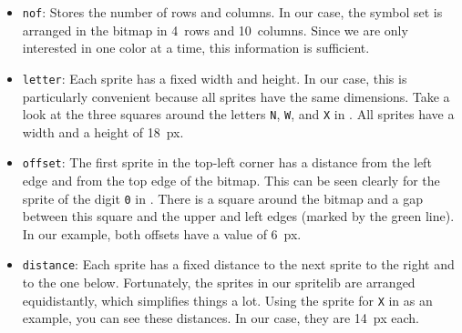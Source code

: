 \begin{itemize}
	\item \texttt{nof}: Stores the number of rows and columns. In our case, the symbol set is arranged in the bitmap in 4~rows and 10~columns.	Since we are only interested in one color at a time, this information is sufficient.
	
	\item \texttt{letter}: Each sprite has a fixed width and height. In our case, this is particularly convenient because all sprites have the same dimensions. Take a look at the three squares around the letters \texttt{N}, \texttt{W}, and \texttt{X} in . All sprites have a width and a height of \SI{18}{px}.
	
	\item \texttt{offset}: The first sprite in the top-left corner has a distance from the left edge and from the top edge of the bitmap. This can be seen clearly for the sprite of the digit \texttt{0} in . There is a square around the bitmap and a gap between this square and the upper and left edges (marked by the green line). In our example, both offsets have a value of \SI{6}{px}.
	
	\item \texttt{distance}: Each sprite has a fixed distance to the next sprite to the right and to the one below. Fortunately, the sprites in our spritelib are arranged equidistantly, which simplifies things a lot. Using the sprite for \texttt{X} in  as an example, you can see these distances. In our case, they are \SI{14}{px} each.
\end{itemize}


